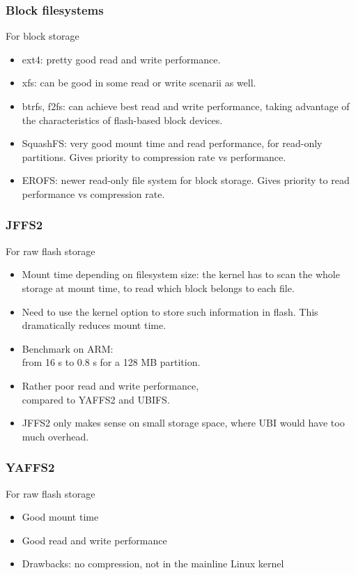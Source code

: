 \begin{frame}
\frametitle{Block filesystems}
For block storage
\begin{itemize}
\item ext4: pretty good read and write performance.
\item xfs: can be good in some read or write scenarii
      as well.
\item btrfs, f2fs: can achieve best read and write performance,
      taking advantage of the characteristics of flash-based block
      devices.
\item SquashFS: very good mount time and read performance, for read-only
      partitions. Gives priority to compression rate vs performance.
\item EROFS: newer read-only file system for block storage. Gives
      priority to read performance vs compression rate.
\end{itemize}
\end{frame}

\begin{frame}
\frametitle{JFFS2}
For raw flash storage
\begin{itemize}
\item Mount time depending on filesystem size: the kernel has to
      scan the whole storage at mount time, to read which block
      belongs to each file.
\item Need to use the  kernel option
      to store such information in flash. This dramatically reduces
      mount time.
\item Benchmark on ARM:\\
      from 16 s to 0.8 s for a 128 MB partition.
\item Rather poor read and write performance,\\
      compared to YAFFS2 and UBIFS.
\item JFFS2 only makes sense on small storage space,
      where UBI would have too much overhead.
\end{itemize}
\end{frame}

\begin{frame}
\frametitle{YAFFS2}
For raw flash storage
\begin{itemize}
\item Good mount time
\item Good read and write performance
\item Drawbacks: no compression, not in the mainline Linux kernel
\end{itemize}
\end{frame}

